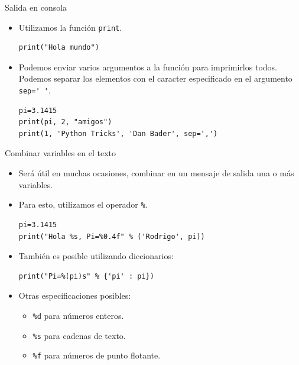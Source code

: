 \documentclass[mathserif]{beamer}
\begin{document}
\begin{frame}[fragile]{Salida en consola}
    \begin{itemize}
        \item Utilizamos la función \lstinline|print|.
\begin{lstlisting}
print("Hola mundo")
\end{lstlisting}
        
        \item Podemos enviar {\blue varios argumentos} a la función para imprimirlos todos. Podemos separar los elementos con el caracter especificado en el argumento \lstinline|sep=' '|.
\begin{lstlisting}
pi=3.1415
print(pi, 2, "amigos")
print(1, 'Python Tricks', 'Dan Bader', sep=',')
\end{lstlisting}        

    \end{itemize}
\end{frame}

\begin{frame}[fragile]{Combinar variables en el texto}
    \begin{itemize}
        \item Será útil en muchas ocasiones, combinar en un mensaje de salida una o más variables.
        
        \item Para esto, utilizamos el operador \lstinline|%|. 
\begin{lstlisting}
pi=3.1415
print("Hola %s, Pi=%0.4f" % ('Rodrigo', pi))
\end{lstlisting}           
        
        \item También es posible utilizando diccionarios:
\begin{lstlisting}
print("Pi=%(pi)s" % {'pi' : pi})
\end{lstlisting}

        \item Otras especificaciones posibles: 
            \begin{itemize}
                \item \lstinline|%d| para números enteros.
                \item \lstinline|%s| para cadenas de texto.
                \item \lstinline|%f| para números de punto flotante.
            \end{itemize}
        
    \end{itemize}
\end{frame}
\end{document}
